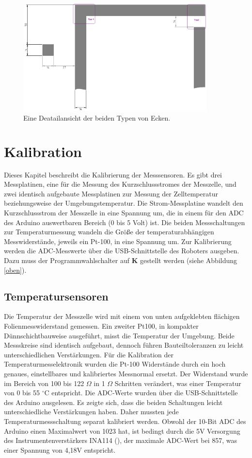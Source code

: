 \documentclass[a4paper,bibtotoc,oneside]{scrbook}
\begin{document}
\begin{figure}[htbp]
\centering
\includegraphics[width=100mm]{img/detail.png}
\caption{Eine Deatailansicht der beiden Typen von Ecken.}\label{ecken}
\end{figure}



\chapter{Kalibration}\thispagestyle{empty}

Dieses Kapitel beschreibt die Kalibrierung der Messsensoren. Es gibt drei Messplatinen, eine für die Messung des Kurzschlussstromes der Messzelle, und zwei identisch aufgebaute Messplatinen zur Messung der Zelltemperatur beziehungsweise der Umgebungstemperatur. Die Strom-Messplatine wandelt den Kurzschlussstrom der Messzelle in eine Spannung um, die in einem für den ADC des Arduino auswertbaren Bereich (0 bis 5 Volt) ist. Die beiden Messschaltungen zur Temperaturmessung wandeln die Größe der temperaturabhängigen Messwiderstände, jeweils ein Pt-100, in eine Spannung um.
Zur Kalibrierung werden die ADC-Messwerte über die USB-Schnittstelle des Roboters ausgeben. Dazu muss der Programmwahlschalter auf \textbf{K} gestellt werden (siehe Abbildung \ref{oben}).


\section{Temperatursensoren}\thispagestyle{empty}
Die Temperatur der Messzelle wird mit einem von unten aufgeklebten flächigen Folienmesswiderstand gemessen. 
Ein zweiter Pt100, in kompakter Dünnschichtbauweise ausgeführt, misst die Temperatur der Umgebung. Beide Messskreise sind identisch aufgebaut, dennoch führen Bauteiltoleranzen zu leicht unterschiedlichen Verstärkungen.
Für die Kalibration der Temperaturmesselektronik wurden die Pt-100 Widerstände durch ein hoch genaues, einstellbares und kalibriertes Messnormal ersetzt. Der Widerstand wurde im Bereich von 100 bis 122 	$\Omega$  in 1 $\Omega$  Schritten verändert, was einer Temperatur von 0 bis 55 $^{\circ}$C entspricht. Die ADC-Werte wurden über die USB-Schnittstelle des Arduino ausgelesen. Es zeigte sich, dass die beiden Schaltungen leicht unterschiedliche Verstärkungen haben. Daher mussten jede Temperaturmessschaltung separat kalibriert werden.
Obwohl der 10-Bit ADC des Arduino einen Maximalwert von 1023 hat, ist bedingt durch die 5V Versorgung des Instrumentenverstärkers INA114 (\cite{ina114}), der maximale ADC-Wert bei 857, was einer Spannung von 4,18V entspricht.  
\end{document}
